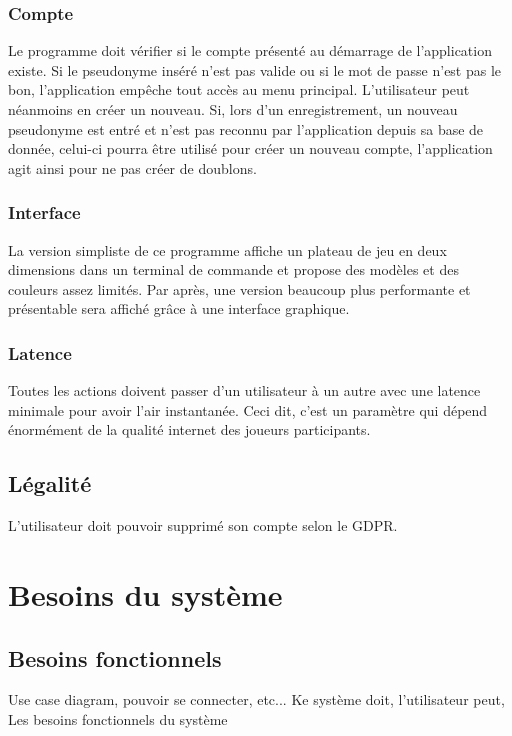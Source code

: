 \documentclass[french, utf8]{article}
\begin{document}
\subsubsection{Compte}
Le programme doit vérifier si le compte présenté au démarrage de l'application existe. Si le pseudonyme inséré n'est pas valide ou si le mot de passe n'est pas le bon, l'application empêche tout accès au menu principal.  \newline
L'utilisateur peut néanmoins en créer un nouveau. Si, lors d'un enregistrement, un nouveau pseudonyme est entré et n'est pas reconnu par l'application depuis sa base de donnée, celui-ci pourra être utilisé pour créer un nouveau compte, l'application agit ainsi pour ne pas créer de doublons. \newline
\subsubsection{Interface}
La version simpliste de ce programme affiche un plateau de jeu en deux dimensions dans un terminal de commande et propose des modèles et des couleurs assez limités. \newline
Par après, une version beaucoup plus performante et présentable sera affiché grâce à une interface graphique.
\subsubsection{Latence}
Toutes les actions doivent passer d’un utilisateur à un autre avec une latence minimale pour avoir l’air instantanée. Ceci dit, c'est un paramètre qui dépend énormément de la qualité internet des joueurs participants.
\subsection{Légalité}
L'utilisateur doit pouvoir supprimé son compte selon le GDPR.


\section{Besoins du système}

\subsection{Besoins fonctionnels}
Use case diagram, pouvoir se connecter, etc...
Ke système doit, l'utilisateur peut,
Les besoins fonctionnels du système
\end{document}

